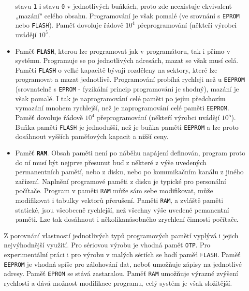 \begin{itemize}[noitemsep]
              stavu \texttt{1} i stavu \texttt{0} v jednotlivých buňkách, proto zde neexistuje 
              ekvivalent „mazání" celého obsahu. Programování je však pomalé (ve srovnání s 
              \texttt{EPROM} nebo \texttt{FLASH}). Paměť dovoluje řádově \(10^4\) přeprogramování 
              (někteří výrobci uvádějí \(10^5\).
        \item Paměť \textbf{\texttt{FLASH}}, kterou lze programovat jak v programátoru, tak i přímo
              v systému. Programuje se po jednotlivých adresách, mazat se však musí celá. Paměti 
              \texttt{FLASH} o velké kapacitě bývají rozděleny na sektory, které lze programovat a 
              mazat jednotlivě. Programování probíhá rychleji než u \texttt{EEPROM} (srovnatelně s 
              \texttt{EPROM} - fyzikální princip programování je shodný), mazání je však pomalé. I 
              tak je naprogramování celé paměti po jejím předchozím vymazání mnohem rychlejší, než 
              je naprogramování celé paměti \texttt{EEPROM}. Paměť dovoluje řádově \(10^4\) 
              přeprogramování (někteří výrobci uvádějí \(10^5\)). Buňka paměti \texttt{FLASH} je 
              jednodušší, než je buňka paměti \texttt{EEPROM} a lze proto dosáhnout vyšších 
              paměťových kapacit a nižší ceny.
        \item Paměť \textbf{\texttt{RAM}}. Obsah paměti není po náběhu napájení definován, program  
              proto do ní musí být nejprve přesunut buď z některé z výše uvedených permanentních 
              pamětí, nebo z disku, nebo po komunikačním kanálu z jiného zařízení. Naplnění 
              programové paměti z disku je typické pro personální počítače. Program v paměti 
              \texttt{RAM} může sám sebe modifikovat, může modifikovat i tabulky vektorů přerušení. 
              Paměti \texttt{RAM}, a zvláště paměti statické, jsou všeobecně rychlejší, než všechny 
              výše uvedené pemanentní paměti. Lze tak dosáhnout i několikanásobného zrychlení 
              činnosti počítače.        
      \end{itemize}
      
      Z porovnání vlastností jednotlivých typů programových pamětí vyplývá i jejich nejvýhodnější 
      využití. Pro sériovou výrobu je vhodná paměť \texttt{OTP}. Pro experimentální práci i pro 
      výrobu v malých sériích se hodí paměť \texttt{FLASH}. Paměť \texttt{EEPROM} je vhodná spíše 
      pro zálohování dat, neboť umožňuje zápisy na jednotlivé adresy. Paměť \texttt{EPROM} se stává 
      zastaralou. Paměť \texttt{RAM} umožňuje výrazné zvýšení rychlosti a dává možnost modifikace 
      programu, celý systém je však složitější.
      
